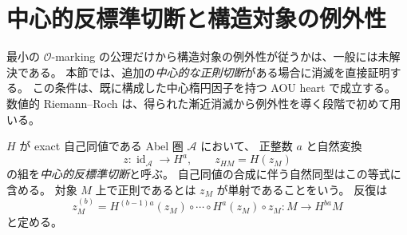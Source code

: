 \section{中心的反標準切断と構造対象の例外性}
\label{sec:central-section-exceptionality}

最小の $\mathcal O$-marking の公理だけから構造対象の例外性が従うかは、一般には未解決である。
本節では、追加の\emph{中心的な正則切断}がある場合に消滅を直接証明する。
この条件は、既に構成した中心楕円因子を持つ AOU heart で成立する。
数値的 Riemann--Roch は、得られた漸近消滅から例外性を導く段階で初めて用いる。

\begin{definition}[中心的反標準切断]
\label{def:central-anticanonical-section}
$H$ が exact 自己同値である Abel 圏 $\mathcal A$ において、
正整数 $a$ と自然変換
\[
 z:\operatorname{id}_{\mathcal A}\longrightarrow H^a,
 \qquad z_{HM}=H(z_M)
\]
の組を\emph{中心的反標準切断}と呼ぶ。
自己同値の合成に伴う自然同型はこの等式に含める。
対象 $M$ 上で正則であるとは $z_M$ が単射であることをいう。
反復は
\[
 z_M^{(b)}=H^{(b-1)a}(z_M)\circ\cdots\circ H^a(z_M)\circ z_M:
 M\longrightarrow H^{ba}M
\]
と定める。
\end{definition}

